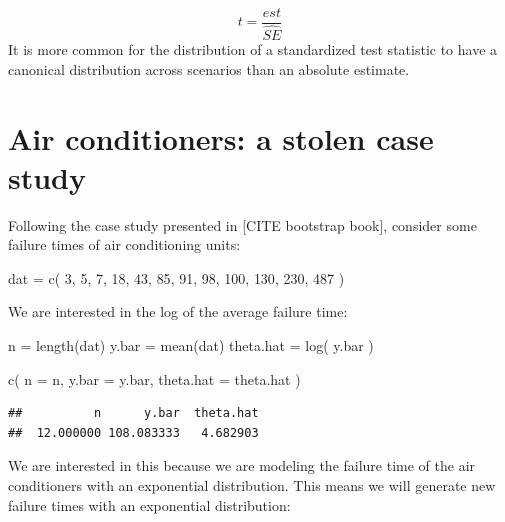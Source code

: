 \documentclass[
]{book}
\newenvironment{Shaded}{\begin{snugshade}}{\end{snugshade}}
\newcommand{\AttributeTok}[1]{\textcolor[rgb]{0.77,0.63,0.00}{#1}}
\newcommand{\DecValTok}[1]{\textcolor[rgb]{0.00,0.00,0.81}{#1}}
\newcommand{\FunctionTok}[1]{\textcolor[rgb]{0.00,0.00,0.00}{#1}}
\newcommand{\NormalTok}[1]{#1}
\newcommand{\OtherTok}[1]{\textcolor[rgb]{0.56,0.35,0.01}{#1}}
\begin{document}
\[ t = \frac{est}{\widehat{SE}} \]
It is more common for the distribution of a standardized test statistic to have a canonical distribution across scenarios than an absolute estimate.

\hypertarget{air-conditioners-a-stolen-case-study}{%
\section{Air conditioners: a stolen case study}\label{air-conditioners-a-stolen-case-study}}

Following the case study presented in {[}CITE bootstrap book{]}, consider some failure times of air conditioning units:

\begin{Shaded}
\begin{Highlighting}[]
\NormalTok{dat }\OtherTok{=} \FunctionTok{c}\NormalTok{( }\DecValTok{3}\NormalTok{, }\DecValTok{5}\NormalTok{, }\DecValTok{7}\NormalTok{, }\DecValTok{18}\NormalTok{, }\DecValTok{43}\NormalTok{, }\DecValTok{85}\NormalTok{, }\DecValTok{91}\NormalTok{, }\DecValTok{98}\NormalTok{, }\DecValTok{100}\NormalTok{, }\DecValTok{130}\NormalTok{, }\DecValTok{230}\NormalTok{, }\DecValTok{487}\NormalTok{ )}
\end{Highlighting}
\end{Shaded}

We are interested in the log of the average failure time:

\begin{Shaded}
\begin{Highlighting}[]
\NormalTok{n }\OtherTok{=} \FunctionTok{length}\NormalTok{(dat)}
\NormalTok{y.bar }\OtherTok{=} \FunctionTok{mean}\NormalTok{(dat)}
\NormalTok{theta.hat }\OtherTok{=} \FunctionTok{log}\NormalTok{( y.bar )}

\FunctionTok{c}\NormalTok{( }\AttributeTok{n =}\NormalTok{ n, }\AttributeTok{y.bar =}\NormalTok{ y.bar, }\AttributeTok{theta.hat =}\NormalTok{ theta.hat )}
\end{Highlighting}
\end{Shaded}

\begin{verbatim}
##          n      y.bar  theta.hat 
##  12.000000 108.083333   4.682903
\end{verbatim}

We are interested in this because we are modeling the failure time of the air conditioners with an exponential distribution.
This means we will generate new failure times with an exponential distribution:
\end{document}
